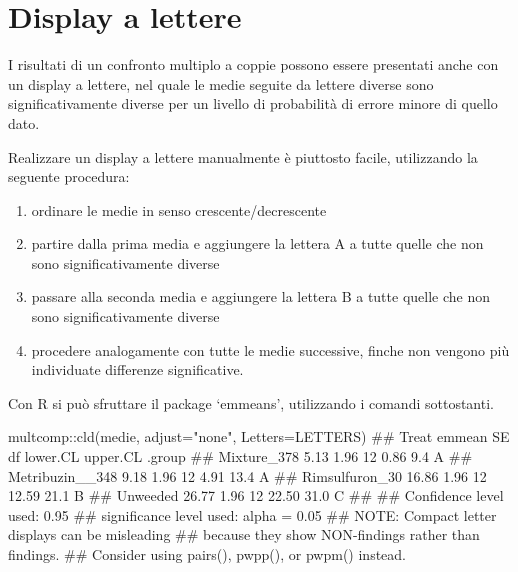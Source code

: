 \documentclass[a4paper,12pt,oneside]{book}
\providecommand{\tightlist}{%
  \setlength{\itemsep}{0pt}\setlength{\parskip}{0pt}}
\newenvironment{Shaded}{\begin{snugshade}}{\end{snugshade}}
\newcommand{\SpecialCharTok}[1]{#1}
\newcommand{\StringTok}[1]{#1}
\newcommand{\DocumentationTok}[1]{#1}
\newcommand{\FunctionTok}[1]{#1}
\newcommand{\AttributeTok}[1]{#1}
\newcommand{\AlertTok}[1]{#1}
\newcommand{\NormalTok}[1]{#1}
\begin{document}
\normalsize

\hypertarget{display-a-lettere}{%
\section{Display a lettere}\label{display-a-lettere}}

I risultati di un confronto multiplo a coppie possono essere presentati anche con un display a lettere, nel quale le medie seguite da lettere diverse sono significativamente diverse per un livello di probabilità di errore minore di quello dato.

Realizzare un display a lettere manualmente è piuttosto facile, utilizzando la seguente procedura:

\begin{enumerate}
\def\labelenumi{\arabic{enumi}.}
\tightlist
\item
  ordinare le medie in senso crescente/decrescente
\item
  partire dalla prima media e aggiungere la lettera A a tutte quelle che non sono significativamente diverse
\item
  passare alla seconda media e aggiungere la lettera B a tutte quelle che non sono significativamente diverse
\item
  procedere analogamente con tutte le medie successive, finche non vengono più individuate differenze significative.
\end{enumerate}

Con R si può sfruttare il package `emmeans', utilizzando i comandi sottostanti.

\begin{Shaded}
\begin{Highlighting}[]
\NormalTok{multcomp}\SpecialCharTok{::}\FunctionTok{cld}\NormalTok{(medie, }\AttributeTok{adjust=}\StringTok{"none"}\NormalTok{, }\AttributeTok{Letters=}\NormalTok{LETTERS)}
\DocumentationTok{\#\#  Treat           emmean   SE df lower.CL upper.CL .group}
\DocumentationTok{\#\#  Mixture\_378       5.13 1.96 12     0.86      9.4  A    }
\DocumentationTok{\#\#  Metribuzin\_\_348   9.18 1.96 12     4.91     13.4  A    }
\DocumentationTok{\#\#  Rimsulfuron\_30   16.86 1.96 12    12.59     21.1   B   }
\DocumentationTok{\#\#  Unweeded         26.77 1.96 12    22.50     31.0    C  }
\DocumentationTok{\#\# }
\DocumentationTok{\#\# Confidence level used: 0.95 }
\DocumentationTok{\#\# significance level used: alpha = 0.05 }
\DocumentationTok{\#\# }\AlertTok{NOTE}\DocumentationTok{: Compact letter displays can be misleading}
\DocumentationTok{\#\#       because they show NON{-}findings rather than findings.}
\DocumentationTok{\#\#       Consider using \textquotesingle{}pairs()\textquotesingle{}, \textquotesingle{}pwpp()\textquotesingle{}, or \textquotesingle{}pwpm()\textquotesingle{} instead.}
\end{Highlighting}
\end{Shaded}
\end{document}
